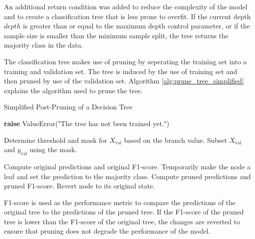 \documentclass[10pt, conference]{IEEEtran}
\begin{document}
An additional return condition was added to reduce the complexity of the model and to create a
classification tree that is less prone to overfit. If the current depth $depth$
is greater than or equal to the maximum depth control parameter, or if the sample size is smaller
than the minimum sample split, the tree returns the majority class in the data.

The classification tree makes use of pruning by seperating the training set into a training
and validation set. The tree is induced by the use of training set and then pruned by use of the
validation set. Algorithm \ref{alg:prune_tree_simplified} explains the algorithm used to 
prune the tree. 
\begin{algorithm}[H]
    \caption{Simplified Post-Pruning of a Decision Tree}
    \label{alg:prune_tree_simplified}
    \begin{algorithmic}[1]
                \State \textbf{raise} ValueError("The tree has not been trained yet.")
            \EndIf
            \State {}
        \EndFunction

                \Return
            \EndIf
            
                \State Determine threshold and mask for $X_{\text{val}}$ based on the branch value.
                \State Subset $X_{\text{val}}$ and $y_{\text{val}}$ using the mask.
                    \State {}
                \EndIf
            \EndFor
            
                \State Compute original predictions and original F1-score.
                \State Temporarily make the node a leaf and set the prediction to the majority class.
                \State Compute pruned predictions and pruned F1-score.
                    \State Revert node to its original state.
                \EndIf
            \EndIf
        \EndFunction
    \end{algorithmic}
\end{algorithm}

F1-score is used as the performance metric to compare the predictions of the original tree to the
predictions of the pruned tree. If the F1-score of the pruned tree is lower than the F1-score
of the original tree, the changes are reverted to ensure that pruning does not degrade the performance
of the model.
\end{document}
